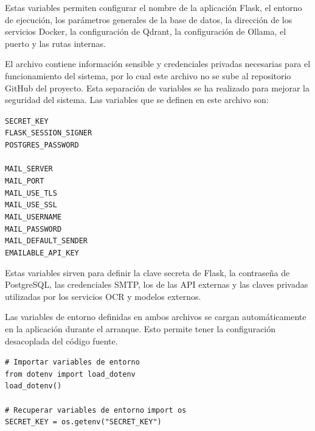 Estas variables permiten configurar el nombre de la aplicación Flask, el entorno de ejecución, los parámetros generales de la base de datos, la dirección de los servicios Docker, la configuración de Qdrant, la configuración de Ollama, el puerto y las rutas internas.

El archivo  contiene información sensible y credenciales privadas necesarias para el funcionamiento del sistema, por lo cual este archivo no se sube al repositorio GitHub del proyecto. Esta separación de variables se ha realizado para mejorar la seguridad del sistema. Las variables que se definen en este archivo son:

\begin{tcolorbox}[
	colback=yellow!8,
	colframe=orange!60!black,
	title=secret.env,
	fonttitle=\bfseries,
	breakable
]
	{\footnotesize
		\noindent
		\texttt{SECRET\_KEY}\\
		\texttt{FLASK\_SESSION\_SIGNER}\\
		\texttt{POSTGRES\_PASSWORD}\\
		\\
		\texttt{MAIL\_SERVER}\\
		\texttt{MAIL\_PORT}\\
		\texttt{MAIL\_USE\_TLS}\\
		\texttt{MAIL\_USE\_SSL}\\
		\texttt{MAIL\_USERNAME}\\
		\texttt{MAIL\_PASSWORD}\\
		\texttt{MAIL\_DEFAULT\_SENDER}\\
		\texttt{EMAILABLE\_API\_KEY}
	}
\end{tcolorbox}

Estas variables sirven para definir la clave secreta de Flask, la contraseña de PostgreSQL, las credenciales SMTP, los  de las API externas y las claves privadas utilizadas por los servicios OCR y modelos externos.

Las variables de entorno definidas en ambos archivos se cargan automáticamente en la aplicación durante el arranque. Esto permite tener la configuración desacoplada del código fuente.

\begin{tcolorbox}[
	colback=black!3,
	colframe=black!30,
	boxrule=0.5pt,
	arc=2mm,
	title= Terminal,
	fonttitle=\bfseries,
	breakable
]
	{\footnotesize
		\noindent
		\texttt{\# Importar variables de entorno}\\
		\texttt{from dotenv import load\_dotenv}\\
		\texttt{load\_dotenv()} \\
		\\
		\texttt{\# Recuperar variables de entorno}
		\texttt{import os}\\
		\texttt{SECRET\_KEY = os.getenv("SECRET\_KEY")}
	}
\end{tcolorbox}

